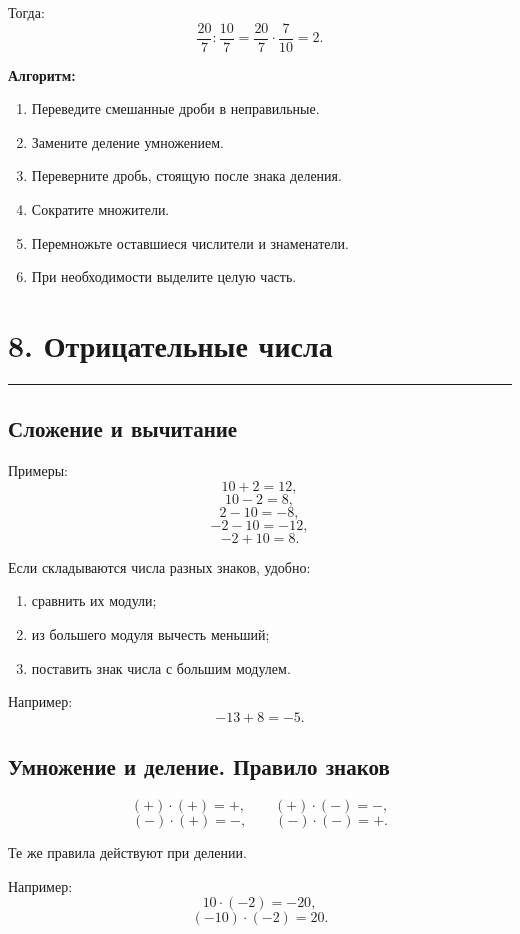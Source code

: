\documentclass[a4paper,12pt]{article}
\newcommand{\sectionline}{%
    \vspace{-0.25em}
    {\color{accent}\rule{\linewidth}{0.7pt}}
    \vspace{0.3em}
}
\newcommand{\important}[1]{\textcolor{darkaccent}{\textbf{#1}}}
\begin{document}
Тогда:
\[
\frac{20}{7}:\frac{10}{7}
=
\frac{20}{7}\cdot\frac7{10}
=
2.
\]

\important{Алгоритм:}
\begin{enumerate}
    \item Переведите смешанные дроби в неправильные.
    \item Замените деление умножением.
    \item Переверните дробь, стоящую после знака деления.
    \item Сократите множители.
    \item Перемножьте оставшиеся числители и знаменатели.
    \item При необходимости выделите целую часть.
\end{enumerate}


\section*{\color{darkaccent}8. Отрицательные числа}
\sectionline

\subsection*{\color{accent}Сложение и вычитание}

Примеры:
\[
10+2=12,
\]
\[
10-2=8,
\]
\[
2-10=-8,
\]
\[
-2-10=-12,
\]
\[
-2+10=8.
\]

Если складываются числа разных знаков, удобно:

\begin{enumerate}
    \item сравнить их модули;
    \item из большего модуля вычесть меньший;
    \item поставить знак числа с большим модулем.
\end{enumerate}

Например:
\[
-13+8=-5.
\]

\subsection*{\color{accent}Умножение и деление. Правило знаков}

\[
(+)\cdot(+)=+,
\qquad
(+)\cdot(-)=-,
\]
\[
(-)\cdot(+)=-,
\qquad
(-)\cdot(-)=+.
\]

Те же правила действуют при делении.

Например:
\[
10\cdot(-2)=-20,
\]
\[
(-10)\cdot(-2)=20.
\]
\end{document}
